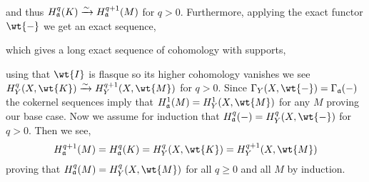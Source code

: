 \documentclass[12pt]{article}
\begin{document}
\begin{enumerate}
\begin{center}
\begin{tikzcd}
\end{tikzcd}
\end{center}
and thus $H^q_\a(K) \iso H^{q+1}_\a(M)$ for $q > 0$. Furthermore, applying the exact functor $\wt{-}$ we get an exact sequence,
\begin{center}
\end{center}
which gives a long exact sequence of cohomology with supports,
\begin{center}
\end{center}
using that $\wt{I}$ is flasque so its higher cohomology vanishes we see $H^q_Y(X, \wt{K}) \iso H^{q+1}_Y(X, \wt{M})$ for $q > 0$. Since $\Gamma_Y(X, \wt{-}) = \Gamma_\a(-)$ the cokernel sequences imply that $H^1_\a(M) = H^1_Y(X, \wt{M})$ for any $M$ proving our base case.
Now we assume for induction that $H^q_\a(-) = H^q_Y(X, \wt{-})$ for $q > 0$. Then we see,
\[ H^{q+1}_\a(M) = H^q_\a(K) = H^q_Y(X, \wt{K}) = H^{q+1}_Y(X, \wt{M}) \]
proving that $H^q_\a(M) = H^q_Y(X, \wt{M})$ for all $q \ge 0$ and all $M$ by induction.


\end{enumerate}
\end{document}
